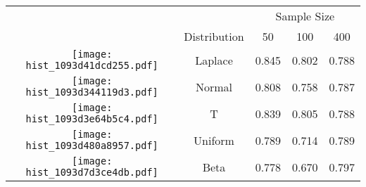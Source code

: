 
\begin{tabular}[t]{>{}ccccc}
\toprule
\multicolumn{2}{c}{  } & \multicolumn{3}{c}{Sample Size} \\
\cmidrule(l{3pt}r{3pt}){3-5}
  & Distribution & 50 & 100 & 400\\
\midrule
\texttt{[image: hist\_1093d41dcd255.pdf]} & Laplace & 0.845 & 0.802 & 0.788\\
\texttt{[image: hist\_1093d344119d3.pdf]} & Normal & 0.808 & 0.758 & 0.787\\
\texttt{[image: hist\_1093d3e64b5c4.pdf]} & T & 0.839 & 0.805 & 0.788\\
\texttt{[image: hist\_1093d480a8957.pdf]} & Uniform & 0.789 & 0.714 & 0.789\\
\texttt{[image: hist\_1093d7d3ce4db.pdf]} & Beta & 0.778 & 0.670 & 0.797\\
\bottomrule
\end{tabular}
